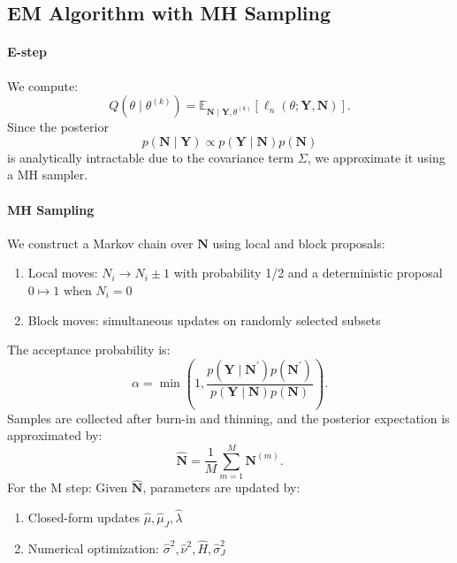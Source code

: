 \documentclass[a4paper,11pt]{amsart}
\theoremstyle{definition}
\theoremstyle{plain}
\theoremstyle{remark}
\newcommand{\1}{\mathbf{1}}
\begin{document}
\subsection{EM Algorithm with MH Sampling}

\paragraph{\textbf{E-step}}

We compute:
\begin{equation*}
	Q(\theta \mid \theta^{(k)})
	=
	\mathbb{E}_{\mathbf{N} \mid \mathbf{Y}, \theta^{(k)}}
	\left[
	\ell_n(\theta; \mathbf{Y}, \mathbf{N})
	\right].
\end{equation*}
Since the posterior
\begin{equation*}
	p(\mathbf{N} \mid \mathbf{Y})
	\propto
	p(\mathbf{Y} \mid \mathbf{N}) p(\mathbf{N})
\end{equation*}
is analytically intractable due to the covariance term $\Sigma$, we approximate it using a MH sampler.
\paragraph{\textbf{MH Sampling}}
We construct a Markov chain over $\mathbf{N}$ using local and block proposals:
\begin{enumerate}[label=(\roman*)]
	\item Local moves: $N_i \to N_i \pm 1$ with probability 1/2 and a deterministic proposal $0\mapsto 1$ when
$N_i=0$
	\item Block moves: simultaneous updates on randomly selected subsets
\end{enumerate}

The acceptance probability is:
\begin{equation*}
	\alpha = \min\left(1,
	\frac{p(\mathbf{Y} \mid \mathbf{N}^\prime)p(\mathbf{N}^\prime)}
	{p(\mathbf{Y} \mid \mathbf{N})p(\mathbf{N})}
	\right).
\end{equation*}
Samples are collected after burn-in and thinning, and the posterior expectation is approximated by:
\begin{equation*}
	\hat{\mathbf{N}} = \frac{1}{M} \sum_{m=1}^M \mathbf{N}^{(m)}.
\end{equation*}
For the M step: 
Given $\hat{\mathbf{N}}$, parameters are updated by:
\begin{enumerate}[label=(\roman*)]
	\item Closed-form updates  $
	\hat{\mu},\hat{\mu}_J,\hat{\lambda}$
	\item Numerical optimization:  $
	\hat{\sigma}^2, \hat{\nu}^2,\hat{H}, \hat{\sigma}_J^2 $
\end{enumerate}
\end{document}
